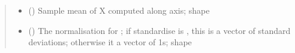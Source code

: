 \documentclass[letterpaper,10pt,english]{sphinxmanual}
\begin{document}
\begin{fulllineitems}
\begin{quote}
\begin{description}
\begin{itemize}
\item {}
\sphinxAtStartPar
{} () \textendash{} Sample mean of X computed along axis;
shape 

\item {}
\sphinxAtStartPar
{} () \textendash{} The normalisation for ;
if standardise is , this is a vector of standard deviations;
otherwise it a vector of 1s;
shape 

\end{itemize}


\end{description}\end{quote}

\end{fulllineitems}

\end{document}

